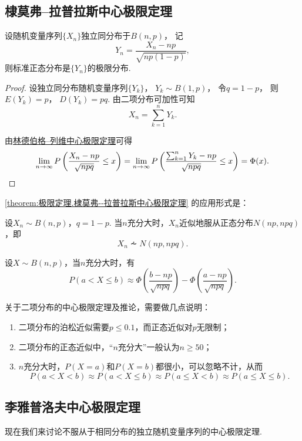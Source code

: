 \subsection{棣莫弗--拉普拉斯中心极限定理}
\begin{theorem}\label{theorem:极限定理.棣莫弗--拉普拉斯中心极限定理}
设随机变量序列\(\{X_n\}\)独立同分布于\(B(n,p)\)，
记\[
	Y_n = \frac{X_n - np}{\sqrt{np(1-p)}},
\]
则标准正态分布是\(\{Y_n\}\)的极限分布.
\begin{proof}
设独立同分布随机变量序列\(\{Y_k\}\)，
\(Y_k \sim B(1,p)\)，
令\(q=1-p\)，
则\(E(Y_k)=p\)，
\(D(Y_k)=pq\).
由二项分布可加性可知\[
	X_n = \sum_{k=1}^n Y_k.
\]

由\hyperref[theorem:极限定理.林德伯格--列维中心极限定理]{林德伯格--列维中心极限定理}可得\[
	\lim_{n\to\infty} P\left(\frac{X_n-np}{\sqrt{npq}} \leq x\right)
	= \lim_{n\to\infty} P\left(\frac{\sum_{k=1}^n{Y_k}-np}{\sqrt{npq}} \leq x\right)
	= \Phi(x).
	\qedhere
\]
\end{proof}
\end{theorem}

\cref{theorem:极限定理.棣莫弗--拉普拉斯中心极限定理} 的应用形式是：
\begin{corollary}
设\(X_n \sim B(n,p)\)，\(q = 1-p\).
当\(n\)充分大时，\(X_n\)近似地服从正态分布\(N(np,npq)\)，即\[
X_n \dotsim N(np,npq).
\]
\end{corollary}

\begin{corollary}
设\(X \sim B(n,p)\)，当\(n\)充分大时，有\[
P(a < X \leq b)
\approx \Phi\left(\frac{b-np}{\sqrt{npq}}\right) - \Phi\left(\frac{a-np}{\sqrt{npq}}\right).
\]
\end{corollary}

关于二项分布的中心极限定理及推论，需要做几点说明：
\begin{enumerate}
\item 二项分布的泊松近似需要\(p \leq 0.1\)，而正态近似对\(p\)无限制；
\item 二项分布的正态近似中，“\(n\)充分大”一般认为\(n \geq 50\)；
\item \(n\)充分大时，\(P(X=a)\)和\(P(X=b)\)都很小，可以忽略不计，从而\[
P(a < X < b)
\approx P(a < X \leq b)
\approx P(a \leq X < b)
\approx P(a \leq X \leq b).
\]
\end{enumerate}

\subsection{李雅普洛夫中心极限定理}
现在我们来讨论不服从于相同分布的独立随机变量序列的中心极限定理.

